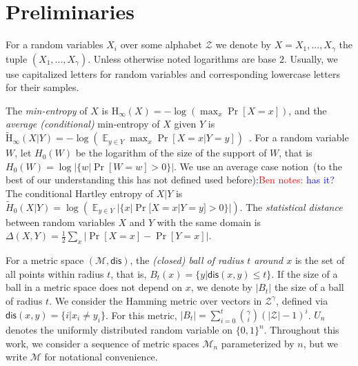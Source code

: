 \documentclass[11pt]{article}
\DeclareMathOperator*{\expe}{\mathbb{E}}
\newcommand{\dis}{\ensuremath{\mathsf{dis}}}
\newcommand{\Hoo}{\mathrm{H}_\infty}
\newcommand{\Hav}{\tilde{\mathrm{H}}_\infty}
\newtheorem{definition}[theorem]{Definition}
\newcommand{\authnote}[2]{{\textcolor{red}{\textsf{#1 notes: }\textcolor{blue}{ #2}}\marginpar{\textcolor{red}{\textbf{!!!!!}}}}}
\newcommand{\authnote}[2]{}
\newcommand{\bnote}[1]{{\authnote{Ben}{#1}}}
\begin{document}
\section{Preliminaries}
\label{sec:preliminaries}
For a random variables $X_i$ over some alphabet $\mathcal{Z}$ we denote by $X = X_1,..., X_\gamma$  the tuple $(X_1,\dots, X_\gamma)$. %
 Unless otherwise noted logarithms are base $2$.
Usually, we use capitalized letters for random variables and corresponding lowercase letters for their samples.

The {\em min-entropy} of $X$ is $\Hoo(X) = -\log(\max_x \Pr[X=x])$,
and the {\em average (conditional)} min-entropy of $X$ given $Y$ is  $\Hav(X|Y) = -\log(\expe_{y\in Y} \max_{x} \Pr[X=x|Y=y])$~\cite[Section 2.4]{DBLP:journals/siamcomp/DodisORS08}.   For a random variable $W$, let $H_0(W)$ be the logarithm of the size of the support of $W$,  that is $H_0(W) = \log |\{w | \Pr[W=w]>0\}|$.  We use an average case notion~(to the best of our understanding this has not defined used before):\bnote{has it?}
The conditional Hartley entropy of $X |Y $ is $\tilde{H}_0(X |Y) = \log ( \expe_{y\in Y} |\{x | \Pr[X=x |Y=y]>0\}|)$.
The {\em statistical distance} between random variables $X$ and $Y$ with the same domain is $\Delta(X,Y) = \frac12 \sum_x |\Pr[X=x] - \Pr[Y=x]|$.

For a metric space $(\mathcal{M}, \dis)$, the \emph{(closed) ball of radius $t$ around $x$} is the set of all points within radius $t$, that is, $B_t(x) = \{y| \dis(x, y)\leq t\}$.  If the size of a ball in a metric space does not depend on $x$, we denote by $|B_t|$ the size of a ball of radius $t$.  We consider the Hamming metric over vectors in $\mathcal{Z}^\gamma$, defined via $\dis(x,y) = \{i | x_i \neq y_i\}$.  For this metric, $|B_t| = \sum_{i=0}^t {\gamma \choose i} (|\mathcal{Z}|-1)^i $.  $U_n$ denotes the uniformly  distributed random variable on $\{0,1\}^n$.  Throughout this work, we consider a sequence of metric spaces $\mathcal{M}_n$ parameterized by $n$, but we write $\mathcal{M}$ for notational convenience.
\end{document}
